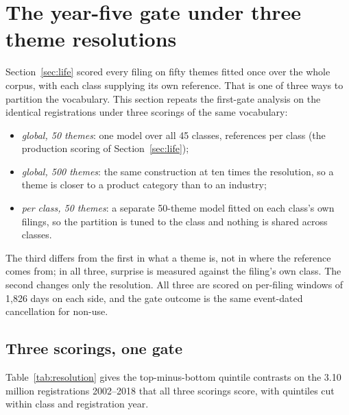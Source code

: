 \section{The year-five gate under three theme resolutions}\label{sec:resolution}

Section~\ref{sec:life} scored every filing on fifty themes fitted once over
the whole corpus, with each class supplying its own reference. That is one
of three ways to partition the vocabulary. This section repeats the
first-gate analysis on the identical registrations under three scorings of
the same vocabulary:

\begin{itemize}[nosep]
\item \emph{global, 50 themes}: one model over all 45 classes, references
per class (the production scoring of Section~\ref{sec:life});
\item \emph{global, 500 themes}: the same construction at ten times the
resolution, so a theme is closer to a product category than to an industry;
\item \emph{per class, 50 themes}: a separate 50-theme model fitted on each
class's own filings, so the partition is tuned to the class and nothing is
shared across classes.
\end{itemize}

\noindent The third differs from the first in what a theme is, not in where
the reference comes from; in all three, surprise is measured against the
filing's own class. The second changes only the resolution. All three are
scored on per-filing windows of 1,826 days on each side, and the gate
outcome is the same event-dated cancellation for non-use.

\subsection{Three scorings, one gate}\label{sec:three_scorings}

Table~\ref{tab:resolution} gives the top-minus-bottom quintile contrasts on
the 3.10 million registrations 2002--2018 that all three scorings score,
with quintiles cut within class and registration year.

\begin{table}[h]\centering\small
\caption{First-gate failure contrasts under three theme scorings, on the
identical registrations. Top-minus-bottom quintile, quintiles cut within
Nice class and registration year, no controls; $n = 3{,}105{,}048$, base
failure 52.3\%.}
\label{tab:resolution}

\end{table}

